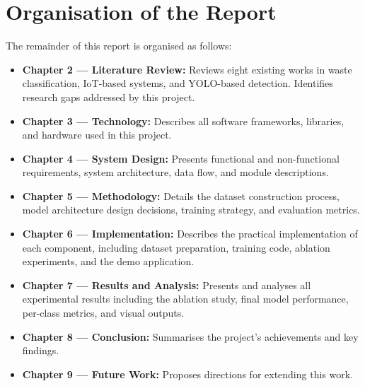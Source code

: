 \section{Organisation of the Report}

The remainder of this report is organised as follows:

\begin{itemize}
    \item \textbf{Chapter 2 — Literature Review:} Reviews eight existing works in waste classification, IoT-based systems, and YOLO-based detection. Identifies research gaps addressed by this project.
    \item \textbf{Chapter 3 — Technology:} Describes all software frameworks, libraries, and hardware used in this project.
    \item \textbf{Chapter 4 — System Design:} Presents functional and non-functional requirements, system architecture, data flow, and module descriptions.
    \item \textbf{Chapter 5 — Methodology:} Details the dataset construction process, model architecture design decisions, training strategy, and evaluation metrics.
    \item \textbf{Chapter 6 — Implementation:} Describes the practical implementation of each component, including dataset preparation, training code, ablation experiments, and the demo application.
    \item \textbf{Chapter 7 — Results and Analysis:} Presents and analyses all experimental results including the ablation study, final model performance, per-class metrics, and visual outputs.
    \item \textbf{Chapter 8 — Conclusion:} Summarises the project's achievements and key findings.
    \item \textbf{Chapter 9 — Future Work:} Proposes directions for extending this work.
\end{itemize}
